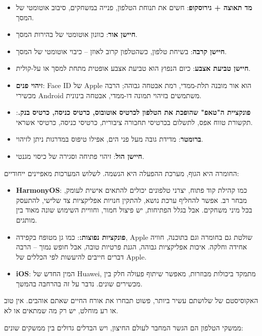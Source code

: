\begin{itemize}
  \item \textbf{מד תאוצה + גירוסקופ}: חשים את תנוחת הטלפון, פנייה במשחקים, סיבוב אוטומטי של המסך.
  \item \textbf{חיישן אור}: כוונון אוטומטי של בהירות המסך.
  \item \textbf{חיישן קרבה}: בשיחת טלפון, כשהטלפון קרוב לאוזן – כיבוי אוטומטי של המסך.
  \item \textbf{חיישן טביעת אצבע}: כיום הנפוץ הוא טביעת אצבע אופטית מתחת למסך או על-קולית.
  \item \textbf{זיהוי פנים}: Face ID של Apple הוא אור מובנה תלת-ממדי, רמת אבטחה גבוהה; הרבה מכשירי Android משתמשים בזיהוי תמונה דו-ממדי, אבטחה בינונית.
  \item \textbf{פונקציית ה"טאפ" שהופכת את הטלפון לכרטיס אוטובוס, כרטיס כניסה, כרטיס בנק.}: תקשורת טווח אפס, לתשלום בכרטיסי תחבורה ציבורית, כרטיסי כניסה, כרטיסי אשראי.
  \item \textbf{ברומטר}: מדידת גובה מעל פני הים, אפילו טיפוס במדרגות ניתן לזיהוי.
  \item \textbf{חיישן הול}: זיהוי פתיחה וסגירה של כיסוי מגנטי.
\end{itemize}


החומרה היא הגוף, מערכת ההפעלה היא הנשמה. לשלוש המערכות מאפיינים ייחודיים:

\begin{itemize}
  \item \textbf{HarmonyOS}: כמו קהילת קוד פתוח, יצרני טלפונים יכולים להתאים אישית לעומק, מבחר רב. אפשר להחליף ערכת נושא, להתקין חנויות אפליקציות צד שלישי, להתעסק בכל מיני משחקים. אבל בגלל הפתיחות, יש פיצול חמור, וחוויית השימוש שונה מאוד בין מותגים.
  \item \textbf{פונקציות נפוצות:}: כמו גן מטופח בקפידה, Apple שולטת גם בחומרה וגם בתוכנה, חוויה אחידה וחלקה. איכות אפליקציות גבוהה, הגנת פרטיות טובה, אבל חופש נמוך – הרבה דברים חייבים להיעשות לפי הכללים של Apple.
  \item \textbf{iOS}: המין החדש של Huawei, מתמקד ביכולות מבוזרות, מאפשר שיתוף פעולה חלק בין מכשירים שונים. נדבר על זה בהרחבה בהמשך.
\end{itemize}

האקוסיסטם של שלושתם עשיר ביותר, פשוט תבחרו את אורח החיים שאתם אוהבים. אין טוב או רע מוחלט, יש רק מה שמתאים או לא.


ממשקי הטלפון הם הגשר המחבר לעולם החיצון, ויש הבדלים גדולים בין ממשקים שונים:

